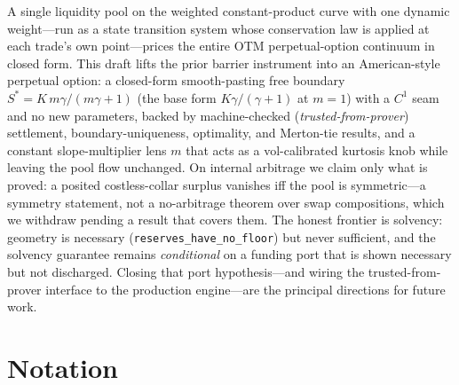 \documentclass[11pt]{article}
\newcommand{\tfp}{\emph{trusted-from-prover}}
\begin{document}
A single liquidity pool on the weighted constant-product curve with one dynamic
weight---run as a state transition system whose conservation law is applied at
each trade's own point---prices the entire OTM perpetual-option continuum in
closed form. This draft lifts the prior barrier instrument into an American-style
perpetual option: a closed-form smooth-pasting free boundary
$S^{\ast}=K\,m\gamma/(m\gamma+1)$ (the base form $K\gamma/(\gamma+1)$ at $m=1$)
with a $C^{1}$ seam and no new parameters, backed by
machine-checked (\tfp{}) settlement, boundary-uniqueness, optimality, and
Merton-tie results, and a constant slope-multiplier lens $m$ that acts as a
vol-calibrated kurtosis knob while leaving the pool flow unchanged. On internal
arbitrage we claim only what is proved: a posited costless-collar surplus
vanishes iff the pool is symmetric---a symmetry statement, not a no-arbitrage
theorem over swap compositions, which we withdraw pending a result that covers
them. The honest frontier is solvency: geometry is necessary
(\texttt{reserves\_have\_no\_floor}) but never sufficient, and the solvency
guarantee remains \emph{conditional} on a funding port that is shown necessary but
not discharged. Closing that port hypothesis---and wiring the trusted-from-prover interface
to the production engine---are the principal directions for future work.

\appendix
\section{Notation}\label{app:notation}
\end{document}
